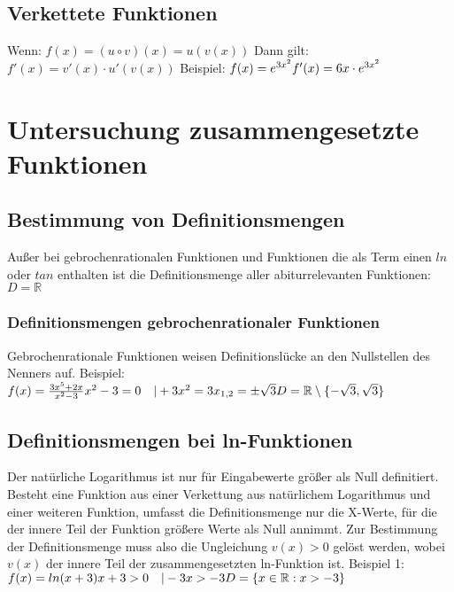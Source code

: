 \documentclass{article}
\begin{document}
    \subsection*{Verkettete Funktionen}
    Wenn: \break
    $f(x) = (u \circ v)(x) = u(v(x))$
    \break
    Dann gilt:\break
    $f'(x) = v'(x) \cdot u'(v(x))$
    \break \break
    Beispiel: \break \break
        $f(x) = e^{3x^2} \break f'(x) = 6x \cdot e^{3x^2}$

    \pagebreak

\section*{Untersuchung zusammengesetzte Funktionen}
\subsection*{Bestimmung von Definitionsmengen}
Außer bei gebrochenrationalen Funktionen und Funktionen die als Term einen $ln$ oder $tan$
enthalten ist die Definitionsmenge aller abiturrelevanten Funktionen: $D = \mathbb{R}$
    \subsubsection*{Definitionsmengen gebrochenrationaler Funktionen}
    Gebrochenrationale Funktionen weisen Definitionslücke an den Nullstellen des Nenners auf.
    \break \break
    Beispiel: \break \break
    $f(x) = \frac{3x^5+2x}{x^2-3} \break \break
    x^2-3 = 0 \quad |+3 \break
    x^2 = 3 \break
    x_{1,2} = \pm\sqrt{3} \break \break
    D = \mathbb{R} \setminus \{ -\sqrt{3},\sqrt{3} \}
    $

    \subsection*{Definitionsmengen bei ln-Funktionen}
    Der natürliche Logarithmus ist nur für Eingabewerte größer als Null definitiert.
    Besteht eine Funktion aus einer Verkettung aus natürlichem Logarithmus und einer weiteren Funktion,
    umfasst die Definitionsmenge nur die X-Werte, für die der innere Teil der Funktion größere Werte als Null annimmt.
    Zur Bestimmung der Definitionsmenge muss also die Ungleichung $v(x) > 0$ gelöst werden, wobei $v(x)$ der innere Teil der zusammengesetzten ln-Funktion ist.
    \break \break
    Beispiel 1:\break \break
    $
    f(x) = ln(x+3) \break \break
    x+3 > 0 \quad |-3 \break
    x > -3 \break \break
    D = \{x \in \mathbb{R}: x > -3\}
    $
    \pagebreak
\end{document}
